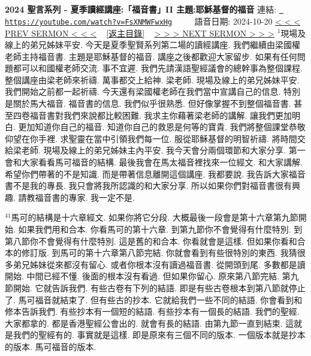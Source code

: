 \documentclass{book}
\begin{document}
\section{}
\label{sec:FsXNMWFwxHg}
\textbf{2024 聖言系列 - 夏季讀經講座:「福音書」II 主題:耶穌基督的福音}
\newline
\newline
連結: \href{https://youtube.com/watch?v=FsXNMWFwxHg}{\texttt{ https://youtube.com/watch?v=FsXNMWFwxHg}} ~~~~ 語音日期: 2024-10-20 
\newline
\newline
\hyperref[sec:BQvEiworls4]{\small{< < < PREV SERMON < < <}}
~
\hyperref[sec:index]{\small{[返主目錄]}}
~
\hyperref[sec:5AhQhWw7knY]{\small{> > > NEXT SERMON > > >}}
\newline
\newline
$^{1}$現場及線上的弟兄姊妹平安.
今天是夏季聖賢系列第二場的讀經講座.
我們繼續由梁國權老師主持福音書.
主題是耶穌基督的福音.
講座之後都歡迎大家留步.
如果有任何問題都可以和國權老師交流.
事不宜遲.
我們先請漢語聖經議會的總幹事為整個課程.
整個講座由梁老師來祈禱.
萬事都交上給神.
梁老師.
現場及線上的弟兄姊妹平安.
我們開始之前都一起祈禱.
今天還有梁國權老師在我們當中宣講自己的信息.
特別是關於馬大福音.
福音書的信息.
我們似乎很熟悉.
但好像掌握不到整個福音書.
甚至四卷福音書對我們來說都比較困難.
我求主你藉著梁老師的講解.
讓我們更加明白.
更加知道你自己的福音.
知道你自己的救恩是何等的寶貴.
我們將整個課堂恭敬仰望在你手裡.
求聖靈在當中引領我們每一位.
服從耶穌基督的明智祈禱.
將時間交給梁老師.
現場及線上的弟兄姊妹主內平安.
我今天會分兩個環節和大家分享.
第一會和大家看看馬可福音的結構.
最後我會在馬太福音裡找來一位經文.
和大家講解.
希望你們帶著的不是知識.
而是帶著信息離開這個講座.
我都要說.
我告訴大家福音書不是我的專長.
我只會將我所認識的和大家分享.
所以如果你們對福音書很有興趣.
請教福音書的專家.
我一定不是.

$^{41}$馬可的結構是十六章經文.
如果你將它分段.
大概最後一段會是第十六章第九節開始.
如果我們用和合本.
你看馬可的第十六章.
到第九節你不會覺得有什麼特別.
到第八節你不會覺得有什麼特別.
這是舊的和合本.
你看就會是這樣.
但如果你看和合本的修訂版.
到馬可的第十六章第八節完結.
你就會看到有些很特別的東西.
我猜很多弟兄姊妹從來都沒有留心.
或者你根本沒有讀過福音書.
從開頭到尾.
多數都是讀開始.
中間已經不懂.
後面的根本沒有看過.
但如果你留心.
原來第八節完結.
第九節開始.
它就告訴我們.
有些古卷有下列的結語.
即是有些古卷根本到第八節就停止了.
馬可福音就結束了.
但有些古的抄本.
它就給我們一些不同的結語.
你會看到和修本告訴我們.
有些抄本有一個短的結語.
有些抄本有一個長的結語.
我們的聖經.
大家都拿的.
都是香港聖經公會出的.
就會有長的結語.
由第九節一直到結束.
這就是我們的聖經有的.
事實就是這樣.
即是原來有三個不同的版本.
一個版本就是抄本的版本.
馬可福音的版本.
\end{document}
